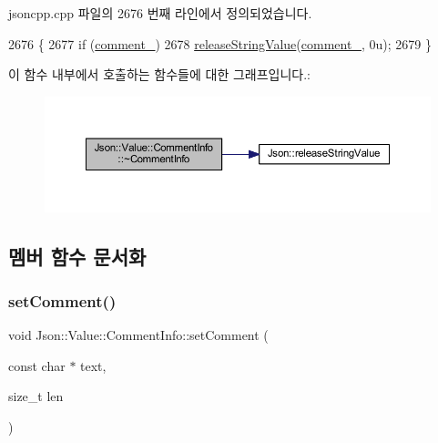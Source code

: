 jsoncpp.\+cpp 파일의 2676 번째 라인에서 정의되었습니다.


\begin{DoxyCode}
2676                                \{
2677   \textcolor{keywordflow}{if} (\hyperlink{struct_json_1_1_value_1_1_comment_info_a020f19c7098bab8ec8fec14cd1a5afb9}{comment\_})
2678     \hyperlink{namespace_json_a3e0d81d514d0e8bddf33b08074214abd}{releaseStringValue}(\hyperlink{struct_json_1_1_value_1_1_comment_info_a020f19c7098bab8ec8fec14cd1a5afb9}{comment\_}, 0u);
2679 \}
\end{DoxyCode}
이 함수 내부에서 호출하는 함수들에 대한 그래프입니다.\+:\nopagebreak
\begin{figure}[H]
\begin{center}
\leavevmode
\includegraphics[width=350pt]{struct_json_1_1_value_1_1_comment_info_ab4d0877190bdbf484e4e2a3bade42ac8_cgraph}
\end{center}
\end{figure}


\subsection{멤버 함수 문서화}
\mbox{\label{struct_json_1_1_value_1_1_comment_info_a4d01c2cd8c07995969c5d636dfd4fa8c}} 
\subsubsection{\texorpdfstring{set\+Comment()}{setComment()}}
{\footnotesize\ttfamily void Json\+::\+Value\+::\+Comment\+Info\+::set\+Comment (\begin{DoxyParamCaption}\item[{const char $\ast$}]{text,  }\item[{size\+\_\+t}]{len }\end{DoxyParamCaption})}




